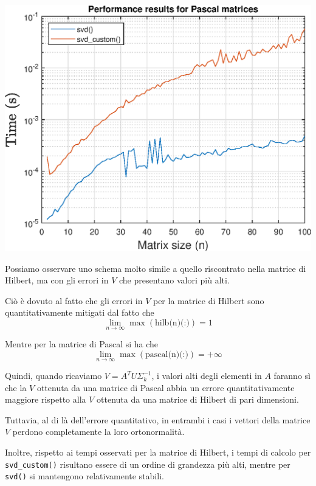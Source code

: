 \includegraphics[scale=.9]{imgs/09_-_Performance_results_for_Pascal_matrices.eps}
\par \vspace{15pt}

\raggedright %
Possiamo osservare uno schema molto simile a quello riscontrato nella matrice di 
Hilbert, ma con gli errori in $V$ che presentano valori più alti.

Ciò è dovuto al fatto che gli errori in $V$ per la matrice di Hilbert sono 
quantitativamente mitigati dal fatto che
\begin{equation*}
	\lim_{n \to \infty} \max(\text{hilb(n)(:)}) = 1
\end{equation*}

Mentre per la matrice di Pascal si ha che
\begin{equation*}
	\lim_{n \to \infty} \max(\text{pascal(n)(:)}) = +\infty
\end{equation*}

Quindi, quando ricaviamo $V = A^T U \Sigma_{k}^{-1}$, i valori alti degli 
elementi in $A$ faranno sì che la $V$ ottenuta da una matrice di Pascal abbia un 
errore quantitativamente maggiore rispetto alla $V$ ottenuta da una matrice di 
Hilbert di pari dimensioni.

Tuttavia, al di là dell'errore quantitativo, in entrambi i casi i vettori della 
matrice $V$ perdono completamente la loro ortonormalità.

Inoltre, rispetto ai tempi osservati per la matrice di Hilbert, i tempi di 
calcolo per \texttt{svd\_custom()} risultano essere di un ordine di grandezza 
più alti, mentre per \texttt{svd()} si mantengono relativamente stabili.


